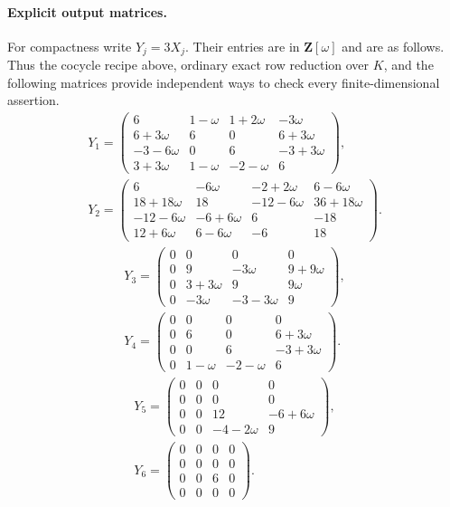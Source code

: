\documentclass[11pt]{article}
\theoremstyle{definition}
\theoremstyle{remark}
\begin{document}
\paragraph{Explicit output matrices.}
For compactness write $Y_j=3X_j$.  Their entries are in
$\mathbf Z[\omega]$ and are as follows.  Thus the cocycle recipe above,
ordinary exact row reduction over $K$, and the following matrices
provide independent ways to check every finite-dimensional assertion.
\[
\begin{gathered}
Y_{1}=\begin{pmatrix}6&1-\omega&1+2\omega&-3\omega\\
6+3\omega&6&0&6+3\omega\\
-3-6\omega&0&6&-3+3\omega\\
3+3\omega&1-\omega&-2-\omega&6\end{pmatrix},\\[1ex]
Y_{2}=\begin{pmatrix}6&-6\omega&-2+2\omega&6-6\omega\\
18+18\omega&18&-12-6\omega&36+18\omega\\
-12-6\omega&-6+6\omega&6&-18\\
12+6\omega&6-6\omega&-6&18\end{pmatrix} .
\end{gathered}
\]
\[
\begin{gathered}
Y_{3}=\begin{pmatrix}0&0&0&0\\
0&9&-3\omega&9+9\omega\\
0&3+3\omega&9&9\omega\\
0&-3\omega&-3-3\omega&9\end{pmatrix},\\[1ex]
Y_{4}=\begin{pmatrix}0&0&0&0\\
0&6&0&6+3\omega\\
0&0&6&-3+3\omega\\
0&1-\omega&-2-\omega&6\end{pmatrix} .
\end{gathered}
\]
\[
\begin{gathered}
Y_{5}=\begin{pmatrix}0&0&0&0\\
0&0&0&0\\
0&0&12&-6+6\omega\\
0&0&-4-2\omega&9\end{pmatrix},\\[1ex]
Y_{6}=\begin{pmatrix}0&0&0&0\\
0&0&0&0\\
0&0&6&0\\
0&0&0&0\end{pmatrix} .
\end{gathered}
\]
\end{document}
